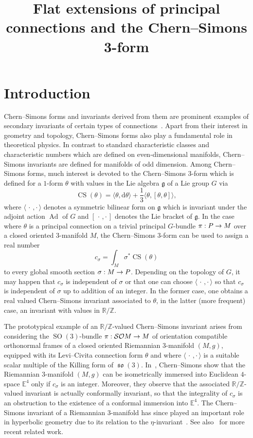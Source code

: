 \documentclass[AHL,Unicode,longabstracts]{cedram}
\title[Flat extensions and the Chern--Simons $3$-form]{Flat extensions of principal connections and the Chern--Simons 3-form}
\author[\initial{A.} \lastname{{\v C}ap}]{\firstname{Andreas} \lastname{{\v C}ap}}
\author[\initial{K.~J.} \lastname{Flood}]{\firstname{Keegan J.} \lastname{Flood}}
\author[\initial{T.} \lastname{Mettler}]{\firstname{Thomas} \lastname{Mettler}}
\renewcommand{\th}{\theta}
\newcommand{\si}{\sigma}
\newcommand{\B}[2]{\langle#1,#2\rangle}
\DeclareMathOperator{\CS}{CS}
\DeclareMathOperator{\SO}{SO}
\DeclareMathOperator{\Ad}{Ad}
\DeclareMathOperator{\fkso}{\mathfrak{so}}
\renewcommand*{\d}{\mathrm{d}}
\newcommand*{\R}{\mathbb{R}}
\newcommand*{\bbE}{\mathbb{E}}
\newcommand{\Z}{\mathbb{Z}}
\newcommand{\fkg}{\mathfrak{g}}
\newcommand{\clSO}{\mathcal{SO}}
\renewcommand*{\to}{\mathchoice{\longrightarrow}{\rightarrow}{\rightarrow}{\rightarrow}}
\newcommand*{\R}{\mathbb{R}}
\begin{document}
\maketitle

\section{Introduction}

Chern--Simons forms and invariants derived from them are prominent examples of secondary invariants of certain types of connections~\cite{MR0353327}. Apart from their interest in geometry and topology, Chern--Simons forms also play a fundamental role in theoretical physics. In contrast to standard characteristic classes and characteristic numbers which are defined on even-dimensional manifolds, Chern--Simons invariants are defined for manifolds of odd dimension. Among Chern--Simons forms, much interest is devoted to the Chern--Simons $3$-form which is defined for a $1$-form $\theta$ with values in the Lie algebra $\fkg$ of a Lie group $G$ via
\[
\CS(\th)=\B{\th}{\d\th}+\frac13 \B{\th}{[\th,\th]},
\]
where $\B{\,\cdot\,}{\cdot\,}$ denotes a symmetric bilinear form on $\fkg$ which is invariant under the adjoint action $\Ad$ of $G$ and $[\,\cdot\,,\cdot\,]$ denotes the Lie bracket of $\fkg$. In the case where $\theta$ is a principal connection on a trivial principal $G$-bundle $\pi : P \to M$ over a closed oriented $3$-manifold $M$, the Chern--Simons $3$-form can be used to assign a real number
\[
c_{\sigma}=\int_M \sigma^*\CS(\theta)
\]
to every global smooth section $\sigma : M \to P$. Depending on the topology of $G$, it may happen that $c_\sigma$ is independent of $\si$ or that one can choose $\B{\,\cdot\,}{\cdot\,}$ so that $c_{\sigma}$ is independent of $\sigma$ up to addition of an integer. In the former case, one obtains a real valued Chern--Simons invariant associated to $\theta$, in the latter (more frequent) case, an invariant with values in $\R/\Z$.

The prototypical example of an $\R/\Z$-valued Chern--Simons invariant arises from considering the $\SO(3)$-bundle $\pi : \clSO M \to M$ of orientation compatible orthonormal frames of a closed oriented Riemannian $3$-manifold $(M,g)$, equipped with its Levi--Civita connection form $\theta$ and where $\B{\,\cdot\,}{\cdot\,}$ is a suitable scalar multiple of the Killing form of $\fkso(3)$. In~\cite{MR0353327}, Chern--Simons show that the Riemannian $3$-manifold $(M,g)$ can be isometrically immersed into Euclidean $4$-space $\bbE^4$ only if $c_{\sigma}$ is an integer. Moreover, they observe that the associated $\R/\Z$-valued invariant is actually conformally invariant, so that the integrality of $c_{\sigma}$ is an obstruction to the existence of a conformal immersion into $\bbE^4$. The Chern--Simons invariant of a Riemannian $3$-manifold has since played an important role in hyperbolic geometry due to its relation to the $\eta$-invariant~\cite{MR807069}. See also~\cite{MR3159164,MR3228423} for more recent related work.
\end{document}
